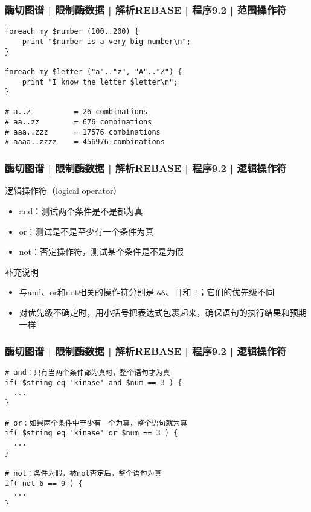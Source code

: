 \begin{frame}[fragile]
  \frametitle{酶切图谱 | 限制酶数据 | 解析REBASE | 程序9.2 | \alert{范围操作符}}
  \vspace{-1.5em}
\begin{lstlisting}
foreach my $number (100..200) {
    print "$number is a very big number\n";
}

foreach my $letter ("a".."z", "A".."Z") {
    print "I know the letter $letter\n";
}

# a..z          = 26 combinations
# aa..zz        = 676 combinations
# aaa..zzz      = 17576 combinations
# aaaa..zzzz    = 456976 combinations
\end{lstlisting}
\end{frame}

\begin{frame}[fragile]
  \frametitle{酶切图谱 | 限制酶数据 | 解析REBASE | 程序9.2 | \alert{逻辑操作符}}
  \begin{block}{逻辑操作符（logical operator）}
    \begin{itemize}
      \item and：测试两个条件是不是都为真
      \item or：测试是不是至少有一个条件为真
      \item not：否定操作符，测试某个条件是不是为假
    \end{itemize}
  \end{block}
  \pause
  \begin{block}{补充说明}
    \begin{itemize}
      \item 与and、or和not相关的操作符分别是 \verb|&&|、\verb=||=和 \verb|!|；它们的优先级不同
      \item 对优先级不确定时，用小括号把表达式包裹起来，确保语句的执行结果和预期一样
    \end{itemize}
  \end{block}
\end{frame}

\begin{frame}[fragile]
  \frametitle{酶切图谱 | 限制酶数据 | 解析REBASE | 程序9.2 | \alert{逻辑操作符}}
  \vspace{-1.5em}
\begin{lstlisting}
# and：只有当两个条件都为真时，整个语句才为真
if( $string eq 'kinase' and $num == 3 ) {
  ...
}

# or：如果两个条件中至少有一个为真，整个语句就为真
if( $string eq 'kinase' or $num == 3 ) {
  ...
}

# not：条件为假，被not否定后，整个语句为真
if( not 6 == 9 ) {
  ...
}
\end{lstlisting}
\end{frame}

